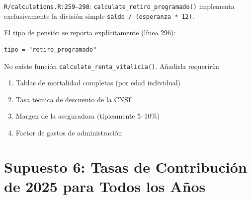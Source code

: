 \documentclass[11pt,a4paper]{report}
\begin{document}
\begin{tcolorbox}[colback=orange!5!white, colframe=orange!75!black, title=\textbf{Aplicaci\'on en C\'odigo}]
\texttt{R/calculations.R:259--298}: \texttt{calculate\_retiro\_programado()} implementa exclusivamente la divisi\'on simple \texttt{saldo / (esperanza * 12)}.

El tipo de pensi\'on se reporta expl\'icitamente (l\'inea 296):
\begin{lstlisting}
tipo = "retiro_programado"
\end{lstlisting}

No existe funci\'on \texttt{calculate\_renta\_vitalicia()}. A\~nadirla requerir\'ia:
\begin{enumerate}
  \item Tablas de mortalidad completas (por edad individual)
  \item Tasa t\'ecnica de descuento de la CNSF
  \item Margen de la aseguradora (t\'ipicamente 5--10\%)
  \item Factor de gastos de administraci\'on
\end{enumerate}
\end{tcolorbox}


\section{Supuesto 6: Tasas de Contribuci\'on de 2025 para Todos los A\~nos}
\end{document}
